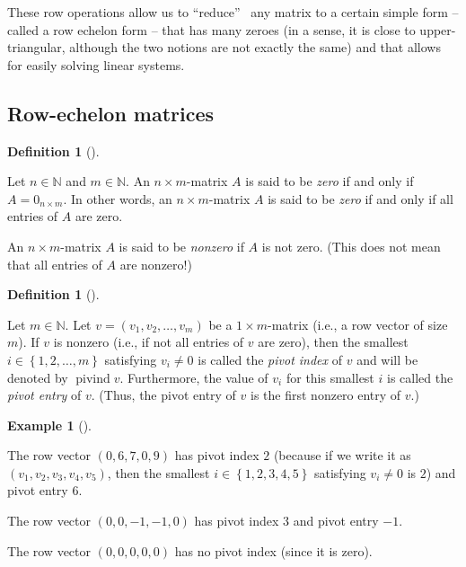 \documentclass[numbers=enddot,12pt,final,onecolumn,notitlepage]{scrartcl}%
\theoremstyle{definition}
\newtheorem{defi}[theo]{Definition}
\newenvironment{definition}[1][]
{\begin{defi}[#1]\begin{leftbar}}
{\end{leftbar}\end{defi}}
\newtheorem{exam}[theo]{Example}
\newenvironment{example}[1][]
{\begin{exam}[#1]\begin{leftbar}}
{\end{leftbar}\end{exam}}
\begin{document}
These row operations allow us to \textquotedblleft reduce\textquotedblright%
\ any matrix to a certain simple form -- called a row echelon form -- that has
many zeroes (in a sense, it is close to upper-triangular, although the two
notions are not exactly the same) and that allows for easily solving linear systems.

\subsection{\label{sect.gauss.row-echelon}Row-echelon matrices}

\begin{definition}
Let $n\in\mathbb{N}$ and $m\in\mathbb{N}$. An $n\times m$-matrix $A$ is said
to be \emph{zero} if and only if $A=0_{n\times m}$. In other words, an
$n\times m$-matrix $A$ is said to be \textit{zero} if and only if all entries
of $A$ are zero.

An $n\times m$-matrix $A$ is said to be \emph{nonzero} if $A$ is not zero.
(This does not mean that all entries of $A$ are nonzero!)
\end{definition}

\begin{definition}
\label{def.pivot}Let $m\in\mathbb{N}$. Let $v=\left(  v_{1},v_{2},\ldots
,v_{m}\right)  $ be a $1\times m$-matrix (i.e., a row vector of size $m$). If
$v$ is nonzero (i.e., if not all entries of $v$ are zero), then the smallest
$i\in\left\{  1,2,\ldots,m\right\}  $ satisfying $v_{i}\neq0$ is called the
\emph{pivot index} of $v$ and will be denoted by $\operatorname*{pivind}v$.
Furthermore, the value of $v_{i}$ for this smallest $i$ is called the
\emph{pivot entry} of $v$. (Thus, the pivot entry of $v$ is the first nonzero
entry of $v$.)
\end{definition}

\begin{example}
The row vector $\left(  0,6,7,0,9\right)  $ has pivot index $2$ (because if we
write it as $\left(  v_{1},v_{2},v_{3},v_{4},v_{5}\right)  $, then the
smallest $i\in\left\{  1,2,3,4,5\right\}  $ satisfying $v_{i}\neq0$ is $2$)
and pivot entry $6$.

The row vector $\left(  0,0,-1,-1,0\right)  $ has pivot index $3$ and pivot
entry $-1$.

The row vector $\left(  0,0,0,0,0\right)  $ has no pivot index (since it is zero).
\end{example}
\end{document}
